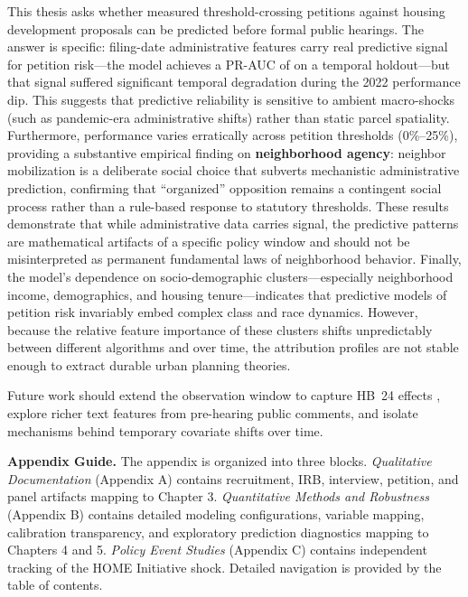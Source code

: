 \documentclass[11pt, letterpaper, oneside]{article}
\begin{document}
This thesis asks whether measured threshold-crossing petitions against housing development proposals can be predicted before formal public hearings. The answer is specific: filing-date administrative features carry real predictive signal for petition risk---the model achieves a PR-AUC of \metricBootstrapFiling{} on a temporal holdout---but that signal suffered significant temporal degradation during the 2022 performance dip. This suggests that predictive reliability is sensitive to ambient macro-shocks (such as pandemic-era administrative shifts) rather than static parcel spatiality. Furthermore, performance varies erratically across petition thresholds (0\%--25\%), providing a substantive empirical finding on \textbf{neighborhood agency}: neighbor mobilization is a deliberate social choice that subverts mechanistic administrative prediction, confirming that ``organized'' opposition remains a contingent social process rather than a rule-based response to statutory thresholds. These results demonstrate that while administrative data carries signal, the predictive patterns are mathematical artifacts of a specific policy window and should not be misinterpreted as permanent fundamental laws of neighborhood behavior. Finally, the model's dependence on socio-demographic clusters---especially neighborhood income, demographics, and housing tenure---indicates that predictive models of petition risk invariably embed complex class and race dynamics. However, because the relative feature importance of these clusters shifts unpredictably between different algorithms and over time, the attribution profiles are not stable enough to extract durable urban planning theories.



Future work should extend the observation window to capture HB~24 effects \cite{hb24_2025}, explore richer text features from pre-hearing public comments, and isolate mechanisms behind temporary covariate shifts over time.

\appendix

\newpage
\noindent \textbf{Appendix Guide.} The appendix is organized into three blocks. \textit{Qualitative Documentation} (Appendix A) contains recruitment, IRB, interview, petition, and panel artifacts mapping to Chapter 3. \textit{Quantitative Methods and Robustness} (Appendix B) contains detailed modeling configurations, variable mapping, calibration transparency, and exploratory prediction diagnostics mapping to Chapters 4 and 5. \textit{Policy Event Studies} (Appendix C) contains independent tracking of the HOME Initiative shock. Detailed navigation is provided by the table of contents.
\end{document}
